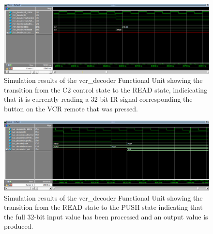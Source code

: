 \documentclass[a4paper]{article}
\begin{document}
\begin{figure}[h]
  \centering
    \includegraphics[width=.98\textwidth]{sims/vcr_testing/moduleTests/vcr_decoder/C2_to_READ_transition.png}
	\caption{Simulation results of the vcr\_decoder Functional Unit showing the transition from the C2 control state to the READ state, indicicating that it is currently reading a 32-bit IR signal corresponding the button on the VCR remote that was pressed.}
    \label{fig:top-level-sim}
\end{figure}
\begin{figure}[h]
  \centering
    \includegraphics[width=.98\textwidth]{sims/vcr_testing/moduleTests/vcr_decoder/READ_to_PUSH_transition.png}
	\caption{Simulation results of the vcr\_decoder Functional Unit showing the transition from the READ state to the PUSH state indicating that the full 32-bit input value has been processed and an output value is produced.}
    \label{fig:top-level-sim}
\end{figure}




\clearpage
\end{document}
